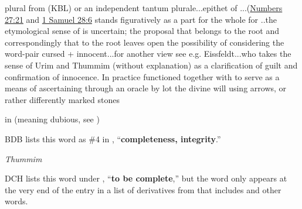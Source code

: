 				\begin{compactdesc}
					\item[HALOT 1750b, PDF 1806] \textbf{} %
						\begin{compactitem}
							\item plural from  (KBL) or an independent tantum plurale...epithet of ...(\hyperref[NUMBERS-27-21]{Numbers 27:21} and \hyperref[1SAMUEL-28-6]{1 Samuel 28:6}  stands figuratively as a part for the whole for ..the etymological sense of  is uncertain; the proposal that  belongs to the root  and correspondingly that  to the root  leaves open the possibility of considering the word-pair cursed + innocent...for another view see e.g. Eissfeldt...who takes the sense of Urim and Thummim (without explanation) as a clarification of guilt and confirmation of innocence. In practice  functioned together with  to serve as a means of ascertaining through an oracle by lot the divine will using arrows, or rather differently marked stones
						\end{compactitem}
					\item[BDB 1070b, PDF 1089] \textbf{}
						\begin{compactitem}
							\item {} in  (meaning dubious, see \he{'wriyM})
								\begin{compactitem}
									\item BDB lists this word as \#4 in , ``\textbf{completeness, integrity}.'' 
								\end{compactitem}
						\end{compactitem}
					\item[DCH PDF 5484a] \textbf{} %
						\begin{compactitem}
							\item \textit{Thummim}
								\begin{compactitem}
									\item DCH lists this word under , ``\textbf{to be complete},'' but the word only appears at the very end of the entry in a list of derivatives from  that includes \he{t*oM} and other words.
								\end{compactitem}
						\end{compactitem}
				\end{compactdesc}
			
